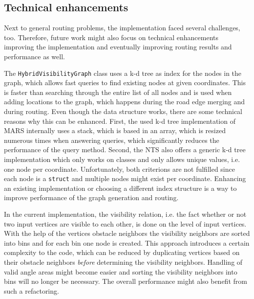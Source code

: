 	\subsection{Technical enhancements}
		
		Next to general routing problems, the implementation faced several challenges, too.
		Therefore, future work might also focus on technical enhancements improving the implementation and eventually improving routing results and performance as well.
	
		The \texttt{HybridVisibilityGraph} class uses a k-d tree as index for the nodes in the graph, which allows fast queries to find existing nodes at given coordinates.
		This is faster than searching through the entire list of all nodes and is used when adding locations to the graph, which happens during the road edge merging and during routing.
		Even though the data structure works, there are some technical reasons why this can be enhanced.
		First, the used k-d tree implementation of MARS internally uses a stack, which is based in an array, which is resized numerous times when answering queries, which significantly reduces the performance of the query method.
		Second, the NTS also offers a generic k-d tree implementation which only works on classes and only allows unique values, i.e. one node per coordinate.
		Unfortunately, both criterions are not fulfilled since each node is a \texttt{struct} and multiple nodes might exist per coordinate.
		Enhancing an existing implementation or choosing a different index structure is a way to improve performance of the graph generation and routing.
		
		In the current implementation, the visibility relation, i.e. the fact whether or not two input vertices are visible to each other, is done on the level of input vertices.
		With the help of the vertices obstacle neighbors the visibility neighbors are sorted into bins and for each bin one node is created.
		This approach introduces a certain complexity to the code, which can be reduced by duplicating vertices based on their obstacle neighbors \emph{before} determining the visibility neighbors.
		Handling of valid angle areas might become easier and sorting the visibility neighbors into bins will no longer be necessary.
		The overall performance might also benefit from such a refactoring.

